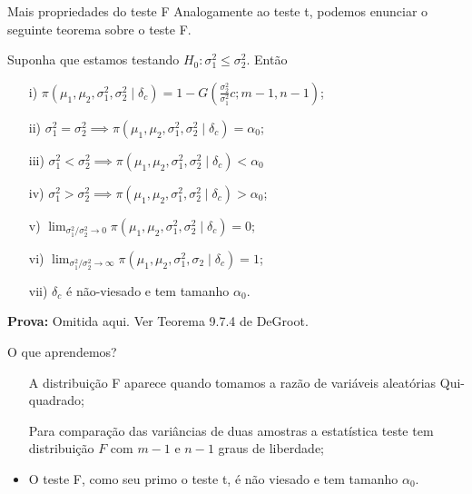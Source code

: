   \begin{frame}{Mais propriedades do teste F}
 Analogamente ao teste t, podemos enunciar o seguinte teorema sobre o teste F.
 \begin{theo}
 Suponha que estamos testando $H_0: \sigma_1^2 \leq \sigma_2^2$.
 Então
 \begin{itemize}
 \item [i)] $\pi(\mu_1, \mu_2, \sigma_1^2, \sigma_2^2 \mid \delta_c) = 1 -G\left(\frac{\sigma_2^2}{\sigma_1^2}c; m-1, n-1\right)$;
 \item [ii)] $\sigma_1^2 = \sigma_2^2 \implies \pi(\mu_1, \mu_2, \sigma_1^2, \sigma_2^2 \mid \delta_c) = \alpha_0$;
 \item [iii)] $\sigma_1^2 < \sigma_2^2 \implies \pi(\mu_1, \mu_2, \sigma_1^2, \sigma_2^2 \mid \delta_c) < \alpha_0$
 \item [iv)] $\sigma_1^2 > \sigma_2^2 \implies \pi(\mu_1, \mu_2, \sigma_1^2, \sigma_2^2 \mid \delta_c) > \alpha_0$;
 \item [v)] $\lim_{\sigma_1^2/\sigma_2^2 \to 0} \pi(\mu_1, \mu_2, \sigma_1^2, \sigma_2^2 \mid \delta_c) = 0$;
 \item [vi)] $\lim_{\sigma_1^2/\sigma_2^2 \to \infty} \pi(\mu_1, \mu_2, \sigma_1^2, \sigma_2 \mid \delta_c) = 1$;
 \item[vii)] $\delta_c$ é não-viesado e tem tamanho $\alpha_0$.
\end{itemize}
\end{theo}
\textbf{Prova:} Omitida aqui. 
Ver Teorema 9.7.4 de DeGroot.  
 \end{frame}
 
\begin{frame}{O que aprendemos?}
\begin{itemize}
  \item[\faLightbulbO] A distribuição F aparece quando tomamos a razão de variáveis aleatórias Qui-quadrado;    
  \item[\faLightbulbO] Para comparação das variâncias de duas amostras a estatística teste tem distribuição $F$ com $m-1$ e $n-1$ graus de liberdade; 
  \item O teste F, como seu primo o teste t, é não viesado e tem tamanho $\alpha_0$.
   \end{itemize}
 \end{frame} 
 
